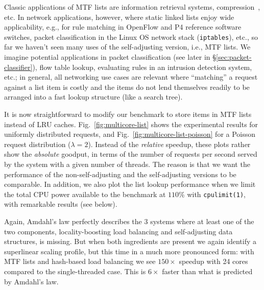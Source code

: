 \documentclass[letterpaper,twocolumn,10pt]{article}
\begin{document}

Classic applications of MTF lists are information retrieval systems, compression~\cite{BentleySTW86}, etc. In network applications, however, where static linked lists enjoy wide applicability, e.g., for rule matching in OpenFlow and P4 reference software switches, packet classification in the Linux OS network stack (\texttt{iptables}), etc., so far we haven't seen many uses of the self-adjusting version, i.e., MTF lists. We imagine potential applications in packet classification (see later in \S\ref{sec:packet-classifier}), flow table lookup, evaluating rules in an intrusion detection system, etc.; in general, all networking use cases are relevant where ``matching'' a request against a list item is costly and the items do not lend themselves readily to be arranged into a fast lookup structure (like a search tree).

It is now straightforward to modify our benchmark to store items in MTF lists instead of LRU caches. Fig.~\ref{fig:multicore-list} shows the experimental results for uniformly distributed requests, and Fig.~\ref{fig:multicore-list-poisson} for a Poisson request distribution ($\lambda=2$). Instead of the \emph{relative} speedup, these plots rather show the \emph{absolute} goodput, in terms of the number of requests per second served by the system with a given number of threads. The reason is that we want the performance of the non-self-adjusting and the self-adjusting versions to be comparable. In addition, we also plot the list lookup performance when we limit the total CPU power available to the benchmark at $110$\% with \texttt{cpulimit(1)}, with remarkable results (see below).

Again, Amdahl's law perfectly describes the $3$ systems where at least one of the two components, locality-boosting load balancing and self-adjusting data structures, is missing. But when both ingredients are present we again identify a superlinear scaling profile, but this time in a much more pronounced form: with MTF lists and hash-based load balancing we see $150\times$ speedup with 24 cores compared to the single-threaded case. This is $6\times$ faster than what is predicted by Amdahl's law.
\end{document}
